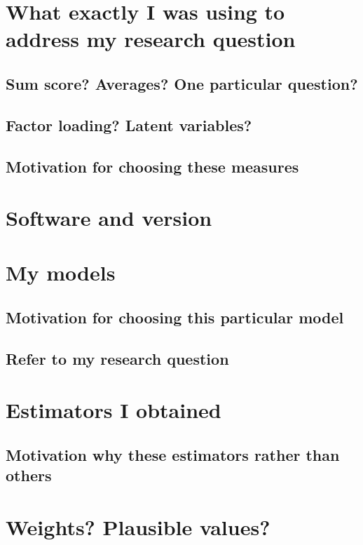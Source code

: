 \documentclass[a4paper,11pt,UKenglish,twoside,openright]{report}\usepackage[]{graphicx}\usepackage[]{color}
\begin{document}
\newpage

\section{What exactly I was using to address my research question}

\subsection{Sum score? Averages? One particular question?}

\subsection{Factor loading? Latent variables?}

\subsection{Motivation for choosing these measures}

\section{Software and version}

\section{My models}

\subsection{Motivation for choosing this particular model}

\subsection{Refer to my research question}

\section{Estimators I obtained}

\subsection{Motivation why these estimators rather than others}

\section{Weights? Plausible values?}
\end{document}
